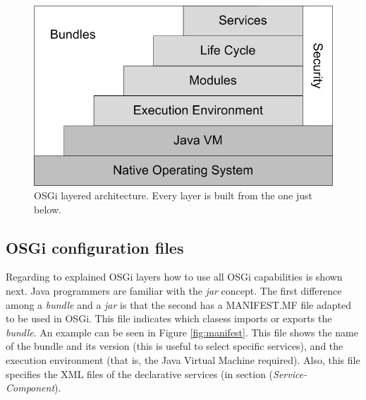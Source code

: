 \documentclass{sig-alternate}
\begin{document}
\begin{figure}[t] 
\begin{center} 
\includegraphics[scale=0.8]{images/osgi-oficial.eps} 
\end{center} 
\caption{OSGi layered architecture. Every layer is built from the one just below.} 
\label{fig:osgi-original} 
\end{figure}


\subsection{OSGi configuration files}
Regarding to explained OSGi layers how to use all OSGi capabilities is shown next. Java programmers are familiar with the {\em jar} concept. The first difference among a {\em bundle} and a {\em jar} is that the second has a MANIFEST.MF file adapted to be used in OSGi. This file indicates which clasess imports or exports the {\em bundle}. An example can be seen in Figure \ref{fig:manifest}. This file shows the name of the bundle and its version (this is useful to select specific services), and the execution environment (that is, the Java Virtual Machine required). Also, this file specifies the XML files of the declarative services (in section ({\em Service-Component}).
\end{document}
